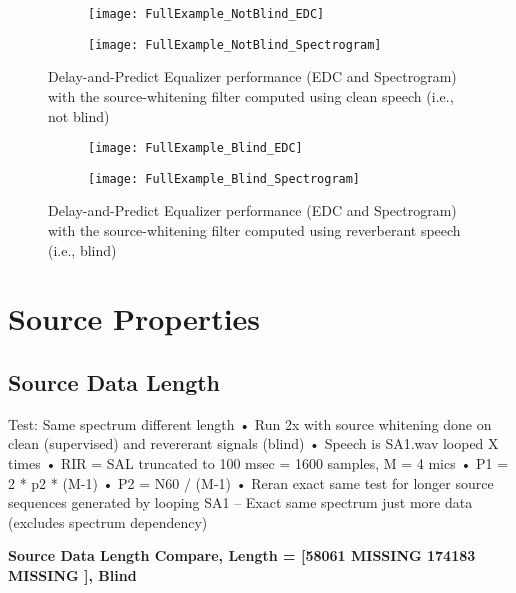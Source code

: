 \begin{figure}[H]
	\centering
	\begin{subfigure}[b]{0.38\textwidth}
		\centering
		\texttt{[image: FullExample\_NotBlind\_EDC]}
	\end{subfigure}
	\begin{subfigure}[b]{0.49\textwidth}
		\centering
		\texttt{[image: FullExample\_NotBlind\_Spectrogram]}
	\end{subfigure}
	\caption{Delay-and-Predict Equalizer performance (EDC and Spectrogram) with the source-whitening filter computed using clean speech (i.e., not blind)}
	\label{fig:fullExample_NotBlind}
\end{figure}


\begin{figure}[H]
	\centering
	\begin{subfigure}[b]{0.38\textwidth}
		\centering
		\texttt{[image: FullExample\_Blind\_EDC]}
	\end{subfigure}
	\begin{subfigure}[b]{0.49\textwidth}
		\centering
		\texttt{[image: FullExample\_Blind\_Spectrogram]}
	\end{subfigure}
	\caption{Delay-and-Predict Equalizer performance (EDC and Spectrogram) with the source-whitening filter computed using reverberant speech (i.e., blind)}
	\label{fig:fullExample_Blind}
\end{figure}




\section{Source Properties}


\subsection{Source Data Length}

Test: Same spectrum different length
•	Run 2x with source whitening done on clean (supervised) and revererant signals (blind)
•	Speech is SA1.wav looped X times
•	RIR = SAL truncated to 100 msec = 1600 samples, M = 4 mics
•	P1 = 2 * p2 * (M-1)
•	P2 = N60 / (M-1)
•	Reran exact same test for longer source sequences generated by looping SA1 – Exact same spectrum just more data (excludes spectrum dependency)

\textbf{Source Data Length Compare, Length = [58061  MISSING 174183 MISSING ], Blind}

